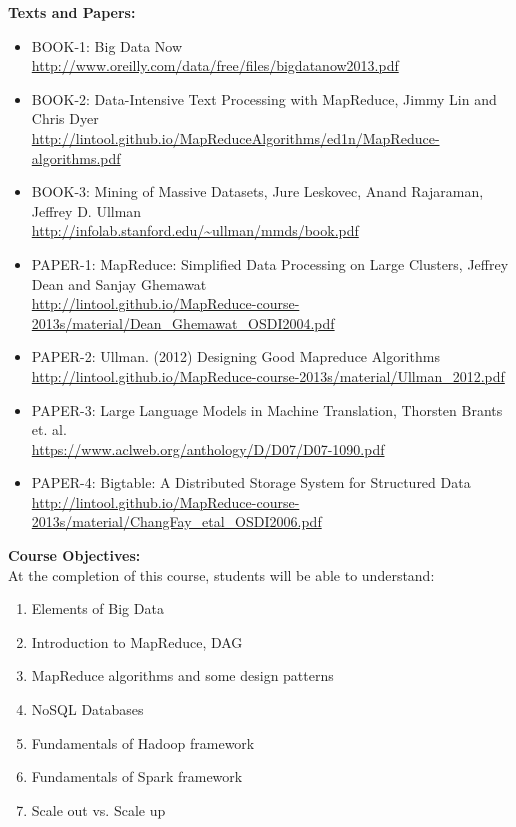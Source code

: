 \documentclass[11pt]{article}
\begin{document}
\textbf {\large Texts and Papers:} 
\begin{itemize}
\item  \label{BOOK-1} BOOK-1: Big Data Now \\
        \url{http://www.oreilly.com/data/free/files/bigdatanow2013.pdf}

\item \label{BOOK-2} BOOK-2: Data-Intensive Text Processing with MapReduce, Jimmy Lin and Chris Dyer \\
        \url{http://lintool.github.io/MapReduceAlgorithms/ed1n/MapReduce-algorithms.pdf}

\item \label{BOOK-3} BOOK-3: Mining of Massive Datasets, Jure Leskovec, Anand Rajaraman, Jeffrey D. Ullman \\
        \url{http://infolab.stanford.edu/~ullman/mmds/book.pdf}

\item \label{PAPER-1} PAPER-1: MapReduce: Simplified Data Processing on Large Clusters, Jeffrey Dean and Sanjay Ghemawat \\
          \url{http://lintool.github.io/MapReduce-course-2013s/material/Dean_Ghemawat_OSDI2004.pdf}

\item \label{PAPER-2} PAPER-2: Ullman. (2012) Designing Good Mapreduce Algorithms \\
         \url{http://lintool.github.io/MapReduce-course-2013s/material/Ullman_2012.pdf}
         
\item \label{PAPER-3} PAPER-3: Large Language Models in Machine Translation, Thorsten Brants et. al. \\
         \url{https://www.aclweb.org/anthology/D/D07/D07-1090.pdf}
         
\item \label{PAPER-4} PAPER-4: Bigtable: A Distributed Storage System for Structured Data \\
         \url{http://lintool.github.io/MapReduce-course-2013s/material/ChangFay_etal_OSDI2006.pdf}
\end{itemize}         


\textbf {\large Course Objectives:} \\
At the completion of this course, students will be able to understand:
\begin{enumerate} \itemsep-0.4em
  \item Elements of Big Data
  \item Introduction to MapReduce, DAG
  \item MapReduce algorithms and some design patterns
  \item NoSQL Databases
  \item Fundamentals of Hadoop framework
  \item Fundamentals of Spark framework
  \item Scale out vs. Scale up
\end{enumerate}
\end{document}
